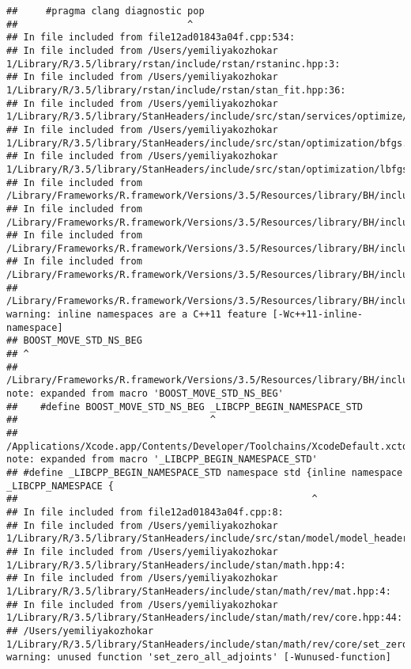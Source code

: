 \documentclass[]{article}
\begin{document}
\begin{verbatim}
##     #pragma clang diagnostic pop
##                              ^
## In file included from file12ad01843a04f.cpp:534:
## In file included from /Users/yemiliyakozhokar 1/Library/R/3.5/library/rstan/include/rstan/rstaninc.hpp:3:
## In file included from /Users/yemiliyakozhokar 1/Library/R/3.5/library/rstan/include/rstan/stan_fit.hpp:36:
## In file included from /Users/yemiliyakozhokar 1/Library/R/3.5/library/StanHeaders/include/src/stan/services/optimize/bfgs.hpp:11:
## In file included from /Users/yemiliyakozhokar 1/Library/R/3.5/library/StanHeaders/include/src/stan/optimization/bfgs.hpp:9:
## In file included from /Users/yemiliyakozhokar 1/Library/R/3.5/library/StanHeaders/include/src/stan/optimization/lbfgs_update.hpp:6:
## In file included from /Library/Frameworks/R.framework/Versions/3.5/Resources/library/BH/include/boost/circular_buffer.hpp:54:
## In file included from /Library/Frameworks/R.framework/Versions/3.5/Resources/library/BH/include/boost/circular_buffer/details.hpp:20:
## In file included from /Library/Frameworks/R.framework/Versions/3.5/Resources/library/BH/include/boost/move/move.hpp:30:
## In file included from /Library/Frameworks/R.framework/Versions/3.5/Resources/library/BH/include/boost/move/iterator.hpp:27:
## /Library/Frameworks/R.framework/Versions/3.5/Resources/library/BH/include/boost/move/detail/iterator_traits.hpp:29:1: warning: inline namespaces are a C++11 feature [-Wc++11-inline-namespace]
## BOOST_MOVE_STD_NS_BEG
## ^
## /Library/Frameworks/R.framework/Versions/3.5/Resources/library/BH/include/boost/move/detail/std_ns_begin.hpp:18:34: note: expanded from macro 'BOOST_MOVE_STD_NS_BEG'
##    #define BOOST_MOVE_STD_NS_BEG _LIBCPP_BEGIN_NAMESPACE_STD
##                                  ^
## /Applications/Xcode.app/Contents/Developer/Toolchains/XcodeDefault.xctoolchain/usr/include/c++/v1/__config:390:52: note: expanded from macro '_LIBCPP_BEGIN_NAMESPACE_STD'
## #define _LIBCPP_BEGIN_NAMESPACE_STD namespace std {inline namespace _LIBCPP_NAMESPACE {
##                                                    ^
## In file included from file12ad01843a04f.cpp:8:
## In file included from /Users/yemiliyakozhokar 1/Library/R/3.5/library/StanHeaders/include/src/stan/model/model_header.hpp:4:
## In file included from /Users/yemiliyakozhokar 1/Library/R/3.5/library/StanHeaders/include/stan/math.hpp:4:
## In file included from /Users/yemiliyakozhokar 1/Library/R/3.5/library/StanHeaders/include/stan/math/rev/mat.hpp:4:
## In file included from /Users/yemiliyakozhokar 1/Library/R/3.5/library/StanHeaders/include/stan/math/rev/core.hpp:44:
## /Users/yemiliyakozhokar 1/Library/R/3.5/library/StanHeaders/include/stan/math/rev/core/set_zero_all_adjoints.hpp:14:17: warning: unused function 'set_zero_all_adjoints' [-Wunused-function]

\end{verbatim}
\end{document}
